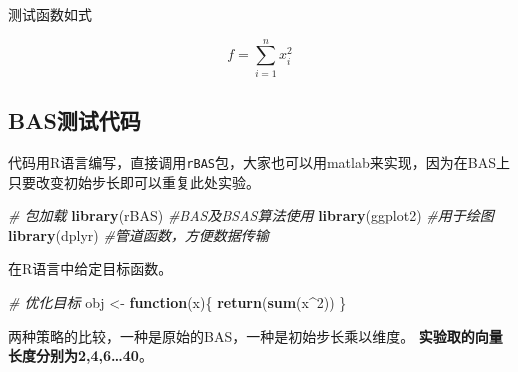 \documentclass[]{ctexbook}
\newenvironment{Shaded}{\begin{snugshade}}{\end{snugshade}}
\newcommand{\KeywordTok}[1]{\textcolor[rgb]{0.13,0.29,0.53}{\textbf{#1}}}
\newcommand{\DecValTok}[1]{\textcolor[rgb]{0.00,0.00,0.81}{#1}}
\newcommand{\StringTok}[1]{\textcolor[rgb]{0.31,0.60,0.02}{#1}}
\newcommand{\CommentTok}[1]{\textcolor[rgb]{0.56,0.35,0.01}{\textit{#1}}}
\newcommand{\ControlFlowTok}[1]{\textcolor[rgb]{0.13,0.29,0.53}{\textbf{#1}}}
\newcommand{\OperatorTok}[1]{\textcolor[rgb]{0.81,0.36,0.00}{\textbf{#1}}}
\newcommand{\NormalTok}[1]{#1}
\begin{document}
测试函数如式

\begin{equation}
f = \sum_{i=1}^{n}x_i^2 
\label{eq:testPT}
\end{equation}

\subsection{BAS测试代码}\label{bas}

代码用R语言编写，直接调用\texttt{rBAS}包，大家也可以用matlab来实现，因为在BAS上只要改变初始步长即可以重复此处实验。

\begin{Shaded}
\begin{Highlighting}[]
\CommentTok{# 包加载}
\KeywordTok{library}\NormalTok{(rBAS)    }\CommentTok{#BAS及BSAS算法使用}
\KeywordTok{library}\NormalTok{(ggplot2) }\CommentTok{#用于绘图}
\KeywordTok{library}\NormalTok{(dplyr)   }\CommentTok{#管道函数，方便数据传输}
\end{Highlighting}
\end{Shaded}

在R语言中给定目标函数。

\begin{Shaded}
\begin{Highlighting}[]
\CommentTok{# 优化目标}
\NormalTok{obj <-}\StringTok{ }\ControlFlowTok{function}\NormalTok{(x)\{}
  \KeywordTok{return}\NormalTok{(}\KeywordTok{sum}\NormalTok{(x}\OperatorTok{^}\DecValTok{2}\NormalTok{))}
\NormalTok{\}}
\end{Highlighting}
\end{Shaded}

两种策略的比较，一种是原始的BAS，一种是初始步长乘以维度。
\textbf{实验取的向量长度分别为2,4,6\ldots{}40}。
\end{document}
